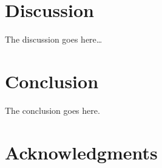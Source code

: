\documentclass[journal,
transmag,
hidelinks]{IEEEtran}
\newcommand{\0}{\mathbf{0}}
\newcommand{\1}{\mathbf{1}}
\begin{document}
\section{Discussion}

The discussion goes here\ldots

\section{Conclusion}
The conclusion goes here.


%





\section*{Acknowledgments}
\end{document}
